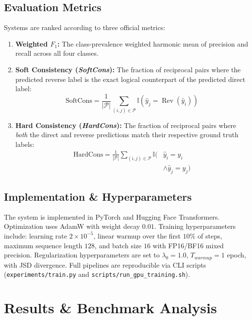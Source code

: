 \documentclass[11pt,a4paper,twocolumn]{article}
\begin{document}
\subsection{Evaluation Metrics}
Systems are ranked according to three official metrics:
\begin{enumerate}
    \item \textbf{Weighted $F_1$:} The class-prevalence weighted harmonic mean of precision and recall across all four classes.
    \item \textbf{Soft Consistency (\textit{SoftCons}):} The fraction of reciprocal pairs where the predicted reverse label is the exact logical counterpart of the predicted direct label:
    \begin{equation}
    \text{SoftCons} = \frac{1}{|\mathcal{P}|} \sum_{(i, j) \in \mathcal{P}} \mathbb{I}\left(\hat{y}_j = \operatorname{Rev}(\hat{y}_i)\right)
    \end{equation}
    \item \textbf{Hard Consistency (\textit{HardCons}):} The fraction of reciprocal pairs where \textit{both} the direct and reverse predictions match their respective ground truth labels:
    \begin{equation}
    \begin{aligned}
    \text{HardCons} = \frac{1}{|\mathcal{P}|} \sum_{(i, j) \in \mathcal{P}} \mathbb{I}\Big( &\hat{y}_i = y_i \\
    &\land \hat{y}_j = y_j\Big)
    \end{aligned}
    \end{equation}
\end{enumerate}

\subsection{Implementation \& Hyperparameters}
The system is implemented in PyTorch and Hugging Face Transformers. Optimization uses AdamW with weight decay $0.01$. Training hyperparameters include: learning rate $2 \times 10^{-5}$, linear warmup over the first $10\%$ of steps, maximum sequence length $128$, and batch size $16$ with FP16/BF16 mixed precision. Regularization hyperparameters are set to $\lambda_0 = 1.0$, $T_{warmup} = 1$ epoch, with JSD divergence. Full pipelines are reproducible via CLI scripts (\texttt{experiments/train.py} and \texttt{scripts/run\_gpu\_training.sh}).

\section{Results \& Benchmark Analysis}
\label{sec:results}
\end{document}
